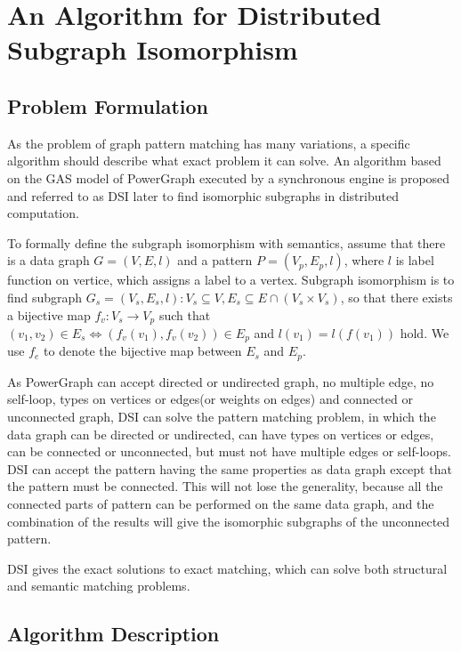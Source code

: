 \section{An Algorithm for Distributed Subgraph Isomorphism}

\subsection{Problem Formulation}

As the problem of graph pattern matching has many variations, a specific algorithm should describe what exact problem it can solve. An algorithm based on the GAS model of PowerGraph executed by a synchronous engine is proposed and referred to as DSI later to find isomorphic subgraphs in distributed computation. 

To formally define the subgraph isomorphism with semantics, assume that there is a data graph $G=(V, E, l)$ and a pattern $P=(V_p, E_p, l)$, where $l$ is label function on vertice, which assigns a label to a vertex. Subgraph isomorphism is to find subgraph $G_s=(V_s, E_s, l): V_s \subseteq V, E_s \subseteq E \cap (V_s \times V_s)$, so that there exists a bijective map $f_v : V_s \rightarrow V_p$ such that $(v_1, v_2) \in E_s \iff (f_v(v_1), f_v(v_2)) \in E_p$ and $l(v_1) = l(f(v_1))$ hold. We use $f_e$ to denote the bijective map between $E_s$ and $E_p$.

As PowerGraph can accept directed or undirected graph, no multiple edge, no self-loop, types on vertices or edges(or weights on edges) and connected or unconnected graph, DSI can solve the pattern matching problem, in which the data graph can be directed or undirected, can have types on vertices or edges, can be connected or unconnected, but must not have multiple edges or self-loops. DSI can accept the pattern having the same properties as data graph except that the pattern must be connected. This will not lose the generality, because all the connected parts of pattern can be performed on the same data graph, and the combination of the results will give the isomorphic subgraphs of the unconnected pattern.

DSI gives the exact solutions to exact matching, which can solve both structural and semantic matching problems.

\subsection{Algorithm Description}
\label{sec:dsi-des}

